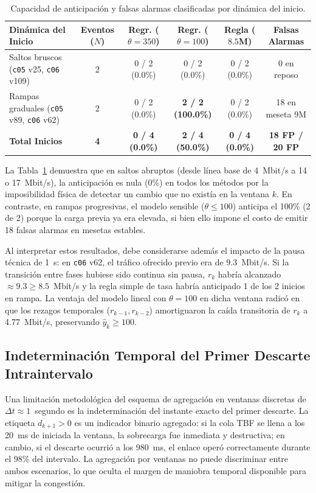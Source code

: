 \documentclass[11pt,a4paper]{article}
\begin{document}
\begin{table}[H]
\centering
\footnotesize
\caption{Capacidad de anticipación y falsas alarmas clasificadas por dinámica del inicio.}
\label{tab:inicios_dinamica}
\begin{tabularx}{\textwidth}{Xccccc}
\toprule
\textbf{Dinámica del Inicio} & \textbf{Eventos ($N$)} & \textbf{Regr. ($\theta=350$)} & \textbf{Regr. ($\theta=100$)} & \textbf{Regla ($8.5$M)} & \textbf{Falsas Alarmas} \\
\midrule
Saltos bruscos (\texttt{c05} v25, \texttt{c06} v109)    & 2 & 0 / 2 (0.0\%) & 0 / 2 (0.0\%) & 0 / 2 (0.0\%) & 0 en reposo \\
Rampas graduales (\texttt{c05} v89, \texttt{c06} v62)  & 2 & 0 / 2 (0.0\%) & \textbf{2 / 2 (100.0\%)} & 0 / 2 (0.0\%) & 18 en meseta 9M \\
\midrule
\textbf{Total Inicios} & \textbf{4} & \textbf{0 / 4 (0.0\%)} & \textbf{2 / 4 (50.0\%)} & \textbf{0 / 4 (0.0\%)} & \textbf{18 FP / 20 FP} \\
\bottomrule
\end{tabularx}
\end{table}

La Tabla~\ref{tab:inicios_dinamica} demuestra que en saltos abruptos (desde línea base de 4~Mbit/s a 14 o 17~Mbit/s), la anticipación es nula (0\%) en todos los métodos por la imposibilidad física de detectar un cambio que no existía en la ventana $k$. En contraste, en rampas progresivas, el modelo sensible ($\theta \le 100$) anticipa el 100\% (2 de 2) porque la carga previa ya era elevada, si bien ello impone el costo de emitir 18 falsas alarmas en mesetas estables.

Al interpretar estos resultados, debe considerarse además el impacto de la pausa técnica de 1~s: en \texttt{c06} v62, el tráfico ofrecido previo era de 9.3~Mbit/s. Si la transición entre fases hubiese sido continua sin pausa, $r_k$ habría alcanzado $\approx 9.3 \ge 8.5$~Mbit/s y la regla simple de tasa habría anticipado 1 de los 2 inicios en rampa. La ventaja del modelo lineal con $\theta = 100$ en dicha ventana radicó en que los rezagos temporales ($r_{k-1}, r_{k-2}$) amortiguaron la caída transitoria de $r_k$ a 4.77~Mbit/s, preservando $\hat{y}_k \ge 100$.

\subsection{Indeterminación Temporal del Primer Descarte Intraintervalo}
Una limitación metodológica del esquema de agregación en ventanas discretas de $\Delta t \approx 1$~segundo es la indeterminación del instante exacto del primer descarte. La etiqueta $d_{k+1} > 0$ es un indicador binario agregado: si la cola TBF se llena a los 20~ms de iniciada la ventana, la sobrecarga fue inmediata y destructiva; en cambio, si el descarte ocurrió a los 980~ms, el enlace operó correctamente durante el 98\% del intervalo. La agregación por ventanas no puede discriminar entre ambos escenarios, lo que oculta el margen de maniobra temporal disponible para mitigar la congestión.
\end{document}
